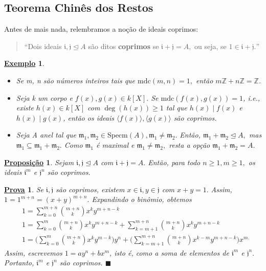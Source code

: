 \documentclass{article}
\newtheorem*{prop*}{\underline{Proposi\c c\~ao}}
\newtheorem{example}{\underline{Exemplo}}
\newtheorem*{proof*}{\underline{Prova}}
\renewcommand\qedsymbol{$\blacksquare$}
\begin{document}
\subsection{Teorema Chinês dos Restos}
Antes de mais nada, relembramos a noção de ideais coprimos:
\begin{quote}
  ``Dois ideais \(\mathfrak{i}, \mathfrak{j}\trianglelefteq{A}\) são ditos \textbf{coprimos} se \(\mathfrak{i}+\mathfrak{j} = A,\) ou seja,
  se \(1\in \mathfrak{i}+\mathfrak{j}.\)''
\end{quote}
\begin{example}
  \begin{itemize}
    \item[1)] Se m, n são números inteiros tais que \(\mathrm{mdc}(m, n) = 1,\) então \(m \mathbb{Z} + n \mathbb{Z} = \mathbb{Z}\).
    \item[2)] Seja k um corpo e \(f(x), g(x)\in k[X].\) Se \(\mathrm{mdc}(f(x), g(x)) = 1\), i.e.,
      existe \(h(x)\in k[X]\) com \(\deg(h(x))\geq 1\) tal que \(h(x)\mid f(x)\) e \(h(x)\mid g(x)\), então os ideais
      \(\langle f(x) \rangle, \langle g(x) \rangle\) são coprimos.
    \item[3)] Seja A anel tal que \(\mathfrak{m}_{1}, \mathfrak{m}_{2}\in \mathrm{Specm}(A), \mathfrak{m}_{1}\neq \mathfrak{m}_{2}.\) Então,
      \(\mathfrak{m}_{1} + \mathfrak{m}_{2} \trianglelefteq{A},\) mas \(\mathfrak{m}_1\subseteq \mathfrak{m}_{1}+\mathfrak{m}_{2}.\) 
      Como \(\mathfrak{m}_{1}\) é maximal e \(\mathfrak{m}_{1}\neq \mathfrak{m}_{2},\) resta a opção \(\mathfrak{m}_{1} + \mathfrak{m}_{2} = A.\)
  \end{itemize}
\end{example}
\begin{prop*}
  Sejam \(\mathfrak{i}, \mathfrak{j}\trianglelefteq{A}\) com \(\mathfrak{i}+\mathfrak{j} = A.\) Então, para todo \(n\geq 1, m\geq 1,\) os ideais
  \(\mathfrak{i}^{m}\) e \(\mathfrak{j}^{n}\) são coprimos.
\end{prop*}
\begin{proof*}
  Se \(\mathfrak{i}, \mathfrak{j}\) são coprimos, existem \(x\in \mathfrak{i}, y\in \mathfrak{j}\) com \(x+y = 1.\)
  Assim, \(1 = 1^{m+n} = (x+y)^{m+n}.\) Expandindo o binômio, obtemos
  \begin{align*}
  &1 = \sum\limits_{k=0}^{m+n}\binom{m+n}{k}x^{k}y^{m+n-k}\\
  &1 = \sum\limits_{k=0}^{m}\binom{m+n}{k}x^{k}y^{m+n-k} + \sum\limits_{k=m+1}^{m+n}\binom{m+n}{k}x^{k}y^{m+n-k}\\
  &1 = \biggl(\sum\limits_{k=0}^{m}\binom{m+n}{k}x^{k}y^{m-k}\biggr)y^{n}+\biggl(\sum\limits_{k=m+1}^{m+n}\binom{m+n}{k}x^{k-m}y^{m+n-k}\biggr)x^{m.}
  \end{align*}
  Assim, escrevemos \(1 = ay^{n}+bx^{m}\), isto é, como a soma de elementos de \(\mathfrak{i}^{m}\) e \(\mathfrak{j}^{n}.\) Portanto,
  \(\mathfrak{i}^{m}\) e \(\mathfrak{j}^{n}\) são coprimos. \qedsymbol
\end{proof*}
\end{document}

